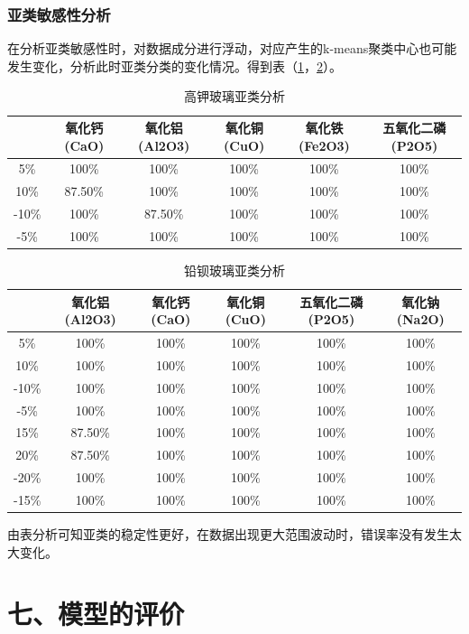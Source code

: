 \documentclass{my_paper}
\begin{document}
\subsubsection{亚类敏感性分析}
在分析亚类敏感性时，对数据成分进行浮动，对应产生的k-means聚类中心也可能发生变化，分析此时亚类分类的变化情况。得到表（\ref{sen3}，\ref{sen4}）。
\newpage 
\begin{longtable}{cccccc}
\caption{高钾玻璃亚类分析}
\label{sen3} \\
\toprule
& 氧化钙(CaO) & 氧化铝(Al2O3) & 氧化铜(CuO) & 氧化铁(Fe2O3) & 五氧化二磷(P2O5) \\\midrule
5\%   & 100\%    & 100\%      & 100\%    & 100\%      & 100\%       \\
10\%  & 87.50\%  & 100\%      & 100\%    & 100\%      & 100\%       \\
-10\% & 100\%    & 87.50\%    & 100\%    & 100\%      & 100\%       \\
-5\%  & 100\%    & 100\%      & 100\%    & 100\%      & 100\%       \\
\bottomrule
\end{longtable}  

\begin{longtable}{cccccc}
  \caption{铅钡玻璃亚类分析}
  \label{sen4} \\
  \toprule
  & 氧化铝(Al2O3) & 氧化钙(CaO) & 氧化铜(CuO) & 五氧化二磷(P2O5) & 氧化钠(Na2O) \\\midrule
  5\%   & 100\%      & 100\%    & 100\%    & 100\%       & 100\%     \\
  10\%  & 100\%      & 100\%    & 100\%    & 100\%       & 100\%     \\
  -10\% & 100\%      & 100\%    & 100\%    & 100\%       & 100\%     \\
  -5\%  & 100\%      & 100\%    & 100\%    & 100\%       & 100\%     \\
  15\%  & 87.50\%    & 100\%    & 100\%    & 100\%       & 100\%     \\
  20\%  & 87.50\%    & 100\%    & 100\%    & 100\%       & 100\%     \\
  -20\% & 100\%      & 100\%    & 100\%    & 100\%       & 100\%     \\
  -15\% & 100\%      & 100\%    & 100\%    & 100\%       & 100\%     \\
  \bottomrule
  \end{longtable}  

  由表分析可知亚类的稳定性更好，在数据出现更大范围波动时，错误率没有发生太大变化。
\section{七、模型的评价}
\end{document}

